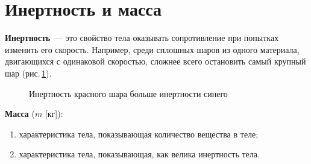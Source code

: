 \documentclass[main.tex]{subfiles}
\begin{document}



 

 

 
   

\section{Инертность и масса}


\textbf{Инертность}~--- это свойство тела оказывать сопротивление при попытках изменить его скорость. Например, среди сплошных шаров из одного материала, двигающихся с одинаковой скоростью, сложнее всего остановить самый крупный шар (рис.\,\ref{fig:p29}).  

    \begin{figure}[H]
    \centering

\caption{Инертность красного шара больше инертности синего}
\label{fig:p29}
\end{figure}

\textbf{Масса} ($m$ [кг]):
\begin{enumerate}
    \item [1)] характеристика тела, показывающая количество вещества в теле; 
    \item [2)] характеристика тела, показывающая, как велика инертность тела.
\end{enumerate}
\end{document}
